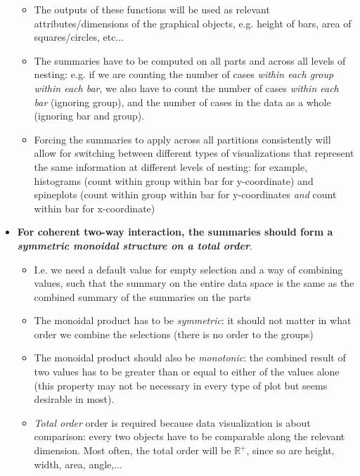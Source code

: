 \documentclass[12pt,a4paper]{article}
\begin{document}
\begin{itemize}
  \begin{itemize}
  \item The outputs of these functions will be used as relevant attributes/dimensions of the graphical objects, e.g. height of bars, area of squares/circles, etc...
  \item The summaries have to be computed on all parts and across all levels of nesting: e.g. if we are counting the number of cases \textit{within each group within each bar}, we also have to count the number of cases \textit{within each bar} (ignoring group), and the number of cases in the data as a whole (ignoring bar and group). 
  \item Forcing the summaries to apply across all partitions consistently will allow for switching between different types of visualizations that represent the same information at different levels of nesting: for example, histograms (count within group within bar for y-coordinate) and spineplots (count within group within bar for y-coordinates \textit{and} count within bar for x-coordinate)
  \end{itemize}

\item \textbf{For coherent two-way interaction, the summaries should form a \textit{symmetric monoidal structure on a total order}}.

  \begin{itemize}
  
  \item I.e. we need a default value for empty selection and a way of combining values, such that the summary on the entire data space is the same as the combined summary of the summaries on the parts
  \item The monoidal product has to be \textit{symmetric}: it should not matter in what order we combine the selections (there is no order to the groups) 
  \item The monoidal product should also be \textit{monotonic}: the combined result of two values has to be greater than or equal to either of the values alone (this property may not be necessary in every type of plot but seems desirable in most).
  \item \textit{Total order} order is required because data visualization is about comparison: every two objects have to be comparable along the relevant dimension. Most often, the total order will be $\mathbb{R}^+$, since so are height, width, area, angle,... 
  \end{itemize}
  

\end{itemize}
\end{document}
